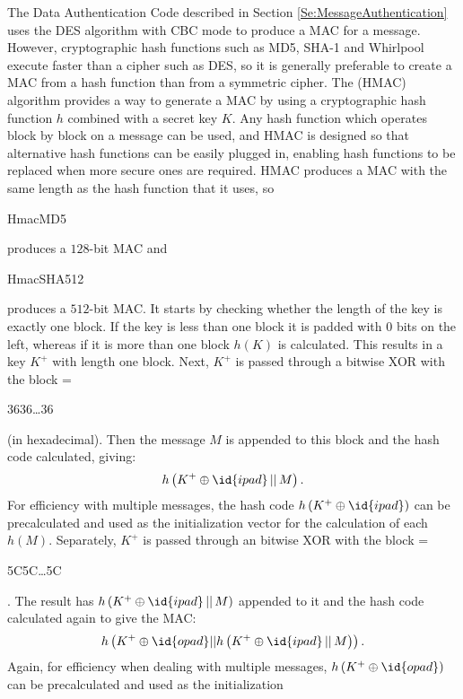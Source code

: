 The Data Authentication Code described in Section \ref{Se:MessageAuthentication}
uses the DES algorithm with CBC mode to produce a MAC for a message.
However, cryptographic hash functions such as MD5, SHA-1 and Whirlpool execute faster than
a cipher such as DES, so it is generally preferable to create a MAC from a hash function
than from a symmetric cipher.
The  (HMAC) algorithm provides a way to
generate a MAC by using a cryptographic hash function $h$ combined with a secret key $K$.
Any hash function which operates block by block on a message can be used, and HMAC
is designed so that alternative hash functions can be easily plugged in,
enabling hash functions to be replaced when more secure ones are required.
HMAC produces a MAC with the same length as the hash function that it uses,
so \begin{code}HmacMD5\end{code} produces
a $128$-bit MAC and \begin{code}HmacSHA512\end{code} produces a $512$-bit MAC.
It starts by checking whether the length of the key is exactly one block.
If the key is less than one block it is padded with $0$ bits on the left,
whereas if it is more than one block $h(K)$ is calculated.
This results in a key $K^+$ with length one block.
Next, $K^+$ is passed through a bitwise XOR with the block
=\begin{code}3636\dots36\end{code} (in hexadecimal).
Then the message $M$ is appended to this block
and the hash code calculated, giving:
\begin{displaymath}
  h\left(K^+\oplus\id{ipad} \,||\, M\right).
\end{displaymath}
For efficiency with multiple messages, the hash code $h\left(K^+\oplus\id{ipad}\right)$
can be precalculated and used as the initialization vector for the calculation of each $h(M)$.
Separately, $K^+$ is passed through an bitwise XOR with the block
=\begin{code}5C5C\dots5C\end{code}.
The result has $h\left(K^+\oplus\id{ipad} \,||\, M\right)$ appended
to it and the hash code calculated again to give the MAC:
\begin{displaymath}
  h\left(K^+\oplus\id{opad}||h\left(K^+\oplus\id{ipad} \,||\, M\right)\right).
\end{displaymath}
Again, for efficiency when dealing with multiple messages,
$h\left(K^+\oplus\id{opad}\right)$ can be precalculated and used as the initialization
